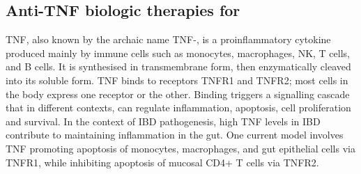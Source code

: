 \begin{outline}
\subsection{Anti-TNF biologic therapies for }

\gls{TNF}, also known by the archaic name \gls{TNF}-\textalpha, is a proinflammatory cytokine produced mainly by immune cells such as monocytes, macrophages, NK, T cells, and B cells.
It is synthesised in transmembrane form, then enzymatically cleaved into its soluble form.
\gls{TNF} binds to receptors TNFR1 and TNFR2; most cells in the body express one receptor or the other.
Binding triggers a signalling cascade that in different contexts, can regulate inflammation, apoptosis, cell proliferation and survival. \autocite{aggarwal2003SignallingPathwaysTNF,kalliolias2016TNFBiologyPathogenic,digby-bell2019InterrogatingHostImmunity}
In the context of \gls{IBD} pathogenesis, high \gls{TNF} levels in \gls{IBD} contribute to maintaining inflammation in the gut.
One current model involves \gls{TNF} promoting apoptosis of monocytes, macrophages, and gut epithelial cells via TNFR1, while inhibiting apoptosis of mucosal CD4+ T cells via TNFR2\autocite{levin2016MechanismActionAntiTNF,adegbola2018AntiTNFTherapyCrohn,digby-bell2019InterrogatingHostImmunity}.


\end{outline}
